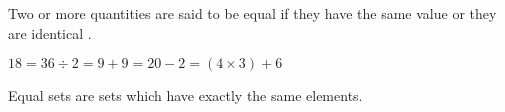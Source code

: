 Two or more quantities are said to be equal if they have the same 
value or they are identical .
\par
$18 = 36 \div 2 = 9+9 = 20-2 = (4 \times 3)+6$
\par
Equal sets are sets which have exactly the same elements.
